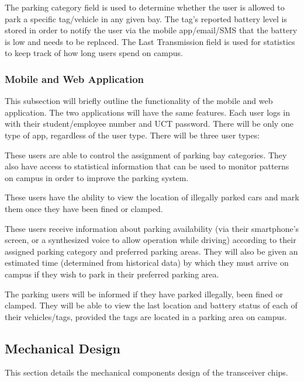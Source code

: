 The parking category field is used to determine whether the user is allowed to park a specific tag/vehicle in any given bay. The tag's reported battery level is stored in order to notify the user via the mobile app/email/SMS that the battery is low and needs to be replaced.
The Last Transmission field is used for statistics to keep track of how long users spend on campus.

\subsubsection{Mobile and Web Application}
This subsection will briefly outline the functionality of the mobile and web application. The two applications will have the same features. Each user logs in with their student/employee number and UCT password. There will be only one type of app, regardless of the user type. There will be three user types:

These users are able to control the assignment of parking bay categories. They also have access to statistical information that can be used to monitor patterns on campus in order to improve the parking system.

These users have the ability to view the location of illegally parked cars and mark them once they have been fined or clamped.

These users receive information about parking availability (via their smartphone's screen, or a synthesized voice to allow operation while driving) according to their assigned parking category and preferred parking areas. They will also be given an estimated time (determined from historical data) by which they must arrive on campus if they wish to park in their preferred parking area.

The parking users will be informed if they have parked illegally, been fined or clamped. They will be able to view the last location and battery status of each of their vehicles/tags, provided the tags are located in a parking area on campus.

\newpage
\subsection{Mechanical Design} 
This section details the mechanical components design of the transceiver chips.

